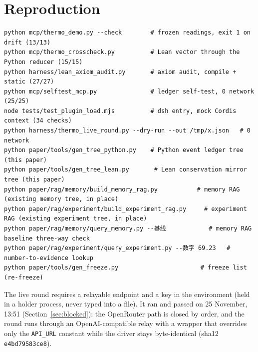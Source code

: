 \documentclass[11pt,a4paper]{article}
\begin{document}
\section{Reproduction}
\label{app:repro}
\begin{verbatim}
python mcp/thermo_demo.py --check        # frozen readings, exit 1 on drift (13/13)
python mcp/thermo_crosscheck.py          # Lean vector through the Python reducer (15/15)
python harness/lean_axiom_audit.py       # axiom audit, compile + static (27/27)
python mcp/selftest_mcp.py               # ledger self-test, 0 network (25/25)
node tests/test_plugin_load.mjs          # dsh entry, mock Cordis context (34 checks)
python harness/thermo_live_round.py --dry-run --out /tmp/x.json   # 0 network
python paper/tools/gen_tree_python.py    # Python event ledger tree (this paper)
python paper/tools/gen_tree_lean.py       # Lean conservation mirror tree (this paper)
python paper/rag/memory/build_memory_rag.py           # memory RAG (existing memory tree, in place)
python paper/rag/experiment/build_experiment_rag.py     # experiment RAG (existing experiment tree, in place)
python paper/rag/memory/query_memory.py --基线            # memory RAG baseline three-way check
python paper/rag/experiment/query_experiment.py --数字 69.23   # number-to-evidence lookup
python paper/tools/gen_freeze.py                       # freeze list (re-freeze)
\end{verbatim}
The live round requires a relayable endpoint and a key in the environment (held in a holder process, never typed into a file). It ran and passed on 25 November, 13:51 (Section~\ref{sec:blocked}): the OpenRouter path is closed by order, and the round runs through an OpenAI-compatible relay with a wrapper that overrides only the \texttt{API\_URL} constant while the driver stays byte-identical (sha12 \texttt{e4bd79583ce8}).
\end{document}
